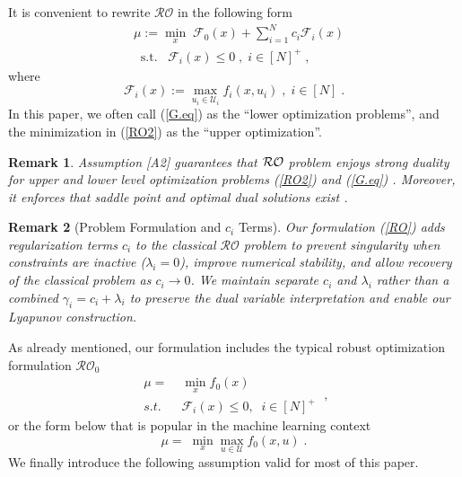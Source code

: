\documentclass[journal,twoside,web]{ieeecolor}
\newcommand{\rev}[1]{#1}
\newtheorem{remark}{Remark}
\begin{document}
It is convenient to rewrite $\mathcal{RO}$ in the following form
\begin{align}
&\mu:=\underset{x}{\min} \; \mathcal{F}_0(x)+\sum_{i=1}^N c_i\mathcal{F}_i(x)\label{RO2}\\
&\;\;\text{s.t.}\;\;\;\mathcal{F}_i(x)\leq 0\;,\;i\in[N]^+\;,\nonumber
\end{align}
where
\begin{equation}\label{G.eq}
\mathcal{F}_i(x):=\max_{u_i\in \mathcal{U}_i} f_i(x,u_i)\;,\; i\in[N]\;.
\end{equation}
In this paper, we often call (\ref{G.eq}) as the ``lower optimization problems'', and the minimization in (\ref{RO2}) as the ``upper optimization''.

\begin{remark} \label{strong_duality_rem}
\rev{Assumption [A2] guarantees that ${\cal RO}$ problem enjoys strong duality for upper and lower level optimization problems (\ref{RO2}) and (\ref{G.eq}) \cite[Section~5.2.3, 5.9.1]{boyd2004}. Moreover, it enforces that saddle point and optimal dual solutions exist \cite{bental2009-2}.}
\end{remark}

\begin{remark}[\rev{Problem Formulation and $c_i$ Terms}]
\rev{Our formulation (\ref{RO}) adds regularization terms $c_i$ to the classical $\mathcal{RO}$ problem to prevent singularity when constraints are inactive ($\lambda_i = 0$), improve numerical stability, and allow recovery of the classical problem as $c_i \to 0$. We maintain separate $c_i$ and $\lambda_i$ rather than a combined $\gamma_i = c_i + \lambda_i$ to preserve the dual variable interpretation and enable our Lyapunov construction.}
\end{remark}

As already mentioned, our formulation includes the typical robust optimization formulation $\mathcal{RO}_0$
\begin{equation}
\begin{array}{lcc}
\mu=&\;\displaystyle\min_x f_0(x)\\
s.t.&\; \mathcal{F}_i(x)\leq 0,\;\;i\in[N]^+
\end{array}\;,
\label{RO3}
\end{equation}
or the form below that is popular in the machine learning context \cite{rafique2022,zhang2021}
\begin{equation}
\mu=\;\displaystyle\min_x\max_{u\in \mathcal{U}} f_0(x,u)\;.
\end{equation}
We finally introduce the following assumption valid for most of this paper.
\end{document}
